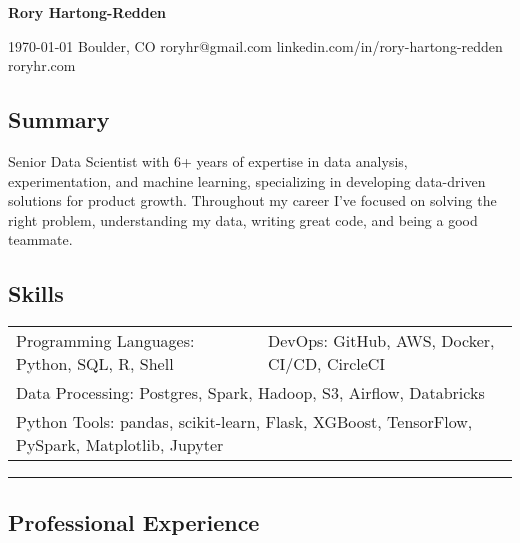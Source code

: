 \documentclass[10pt,letterpaper]{article}
\newenvironment{indentsection}[1]
{\begin{list}{}%
	{\setlength{\leftmargin}{#1}}
	\item[]%
}
{\end{list}}
\begin{document}
{\raggedright \LARGE \bf Rory Hartong-Redden}

{\raggedleft 
\today \/ \textbar
\/ Boulder, CO \textbar
\/ roryhr@gmail.com \textbar
\/ linkedin.com/in/rory-hartong-redden \textbar
\/ roryhr.com
\\
}


\subsection*{Summary}
\begin{centering}
Senior Data Scientist with 6+ years of expertise in data analysis, experimentation, and machine learning, specializing in developing data-driven solutions for product growth.
Throughout my career I've focused on solving the right problem, understanding my data, writing great code, and being a good teammate.
\end{centering}

\subsection*{Skills}

\begin{indentsection}{\parindent}
\begin{tabular}{p{0.5\linewidth}   p{0.5\linewidth}} 
	Programming Languages: Python, SQL, R, Shell
	& DevOps: GitHub, AWS, Docker,  CI/CD, CircleCI \\

	\multicolumn{2}{l}{Data Processing: Postgres, Spark, Hadoop, S3, Airflow, Databricks} \\
	\multicolumn{2}{l}{
		Python Tools: pandas, scikit-learn, Flask, XGBoost, TensorFlow, PySpark, Matplotlib, Jupyter
		}
\end{tabular}
\end{indentsection}

\hrule
\subsection*{Professional Experience}
\end{document}
